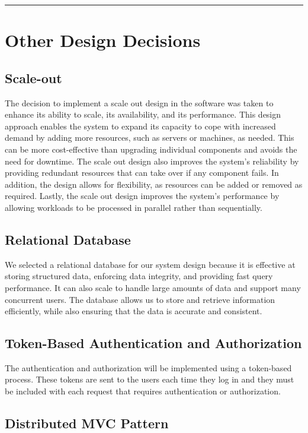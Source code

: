 \documentclass{Configuration_Files/Template}
\begin{document}
{\color{bluepoli}\rule{\linewidth}{0.1pt}}

\section{Other Design Decisions}

\subsection{Scale-out} 

The decision to implement a scale out design in the software was taken to enhance its ability to scale, its availability, and its performance. This design approach enables the system to expand its capacity to cope with increased demand by adding more resources, such as servers or machines, as needed. This can be more cost-effective than upgrading individual components and avoids the need for downtime. The scale out design also improves the system’s reliability by providing redundant resources that can take over if
any component fails. In addition, the design allows for flexibility, as resources can be added or removed as required. Lastly, the scale out design improves the system’s performance by allowing workloads to be processed in parallel rather than sequentially.

\subsection{Relational Database}

We selected a relational database for our system design because it is effective at storing structured data, enforcing data integrity, and providing fast query performance. It can also scale to handle large amounts of data and support many concurrent users. The database allows us to store and retrieve information efficiently, while also ensuring that the data is accurate and consistent.

\subsection{Token-Based Authentication and Authorization}

The authentication and authorization will be implemented using a token-based process. These tokens are sent to the users each time they log in and they must be included with each request that requires authentication or authorization.

\subsection{Distributed MVC Pattern}
\end{document}
